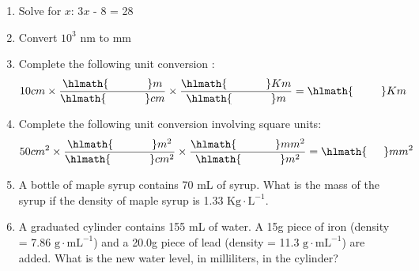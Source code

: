 \documentclass[main.tex]{subfiles}
\begin{document}
\clearpage
\newpage
\thispagestyle{empty}
\begin{fullwidth}
\begin{multicols}{2}\begin{enumerate}[resume]  \setlength\itemsep{0.2em}
    \setcounter{enumi}{\theenumTemp}
    
    

\item Solve for $x$: 3$x$ - 8 = 28
\vspace{3cm}

\item Convert $10^3$ nm to mm
\vspace{3cm}

\item Complete the following unit conversion :\\
\begin{equation*}10cm \times \dfrac{\hlmath{\hspace{35pt}}m}{\hlmath{\hspace{35pt}}cm} \times \dfrac{\hlmath{\hspace{35pt}}Km}{\hlmath{\hspace{35pt}}m}\\   =\hlmath{\hspace{25pt}}Km\end{equation*}

\item Complete the following unit conversion involving square units:\\
\begin{equation*}50cm^2 \times \dfrac{\hlmath{\hspace{35pt}}m^2}{\hlmath{\hspace{35pt}}cm^2} \times \dfrac{\hlmath{\hspace{35pt}}mm^2}{\hlmath{\hspace{35pt}}m^2} \\ 
 =\hlmath{\hspace{15pt}}mm^2\end{equation*}

\item A bottle of maple syrup contains 70 mL of syrup. What is the mass of the syrup if the density of maple syrup is 1.33 $\text{Kg}\cdot \text{L}^{-1}$.
\vspace{2cm}

\item A graduated cylinder contains 155 mL of water. A 15g piece of iron (density = 7.86 $\text{g}\cdot \text{mL}^{-1}$) and a 20.0g piece of lead (density = 11.3 $\text{g}\cdot \text{mL}^{-1}$) are added. What is the new water level, in milliliters, in the cylinder?
\vspace{2cm}


\end{enumerate}
\end{multicols}
\end{fullwidth}
\end{document}
